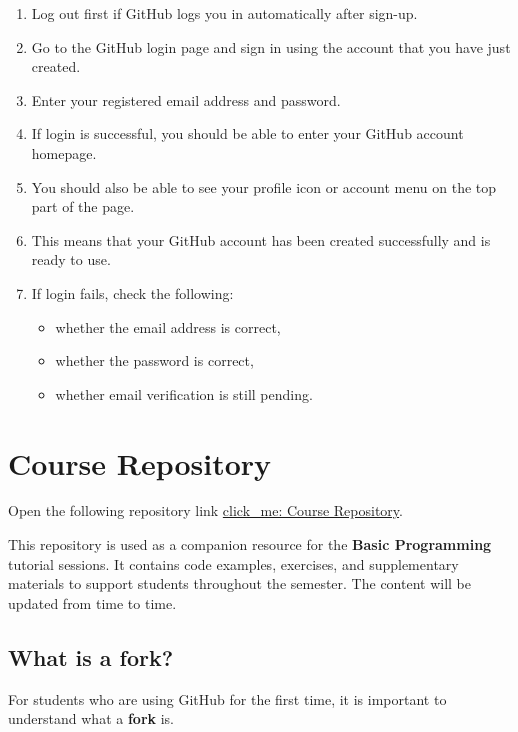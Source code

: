 \begin{enumerate}
    \item Log out first if GitHub logs you in automatically after sign-up.

    \item Go to the GitHub login page and sign in using the account that you have just created.

    \item Enter your registered email address and password.

    \item If login is successful, you should be able to enter your GitHub account homepage.

    \item You should also be able to see your profile icon or account menu on the top part of the page.

    \item This means that your GitHub account has been created successfully and is ready to use.

    \item If login fails, check the following:
    \begin{itemize}
        \item whether the email address is correct,
        \item whether the password is correct,
        \item whether email verification is still pending.
    \end{itemize}
\end{enumerate}

\section*{Course Repository}

Open the following repository link \href{https://github.com/project-with-student/computer_programming_25_26}{click\_me: Course Repository}. 

This repository is used as a companion resource for the \textbf{Basic Programming} tutorial sessions. It contains code examples, exercises, and supplementary materials to support students throughout the semester. The content will be updated from time to time.

\subsection*{What is a fork?}

For students who are using GitHub for the first time, it is important to understand what a \textbf{fork} is.


